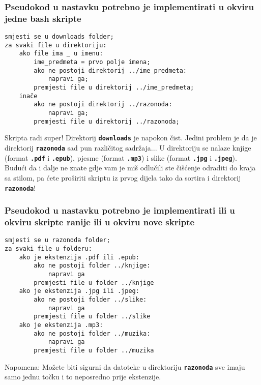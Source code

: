 \documentclass[12pt,a4paper]{article}
\newcommand{\shell}[1]{\texttt{\textbf{#1}}}
\begin{document}
    \subsubsection*{Pseudokod u nastavku potrebno je implementirati u okviru jedne
    bash skripte}
    \begin{verbatim}
smjesti se u downloads folder;
za svaki file u direktoriju:
    ako file ima _ u imenu:
        ime_predmeta = prvo polje imena;
        ako ne postoji direktorij ../ime_predmeta:
            napravi ga;
        premjesti file u direktorij ../ime_predmeta;
    inače
        ako ne postoji direktorij ../razonoda:
            napravi ga;
        premjesti file u direktorij ../razonoda;
    \end{verbatim}

    Skripta radi super! Direktorij \shell{downloads} je napokon čist. Jedini problem
    je da je direktorij \shell{razonoda} sad pun različitog sadržaja... U
    direktoriju se nalaze knjige (format \shell{.pdf} i \shell{.epub}), pjesme
    (format \shell{.mp3}) i  slike (format \shell{.jpg} i \shell{.jpeg}).
    Budući da i dalje ne znate gdje vam je miš odlučili ste čišćenje odraditi
    do kraja sa stilom, pa ćete proširiti skriptu iz prvog dijela tako da sortira
    i direktorij \shell{razonoda}!

    \subsubsection*{Pseudokod u nastavku potrebno je implementirati ili u okviru
    skripte ranije ili u okviru nove skripte}
\begin{verbatim}
smjesti se u razonoda folder;
za svaki file u folderu:
    ako je ekstenzija .pdf ili .epub:
        ako ne postoji folder ../knjige:
            napravi ga
        premjesti file u folder ../knjige
    ako je ekstenzija .jpg ili .jpeg:
        ako ne postoji folder ../slike:
            napravi ga
        premjesti file u folder ../slike
    ako je ekstenzija .mp3:
        ako ne postoji folder ../muzika:
            napravi ga
        premjesti file u folder ../muzika
\end{verbatim}

    Napomena: Možete biti sigurni da datoteke u direktoriju \shell{razonoda} sve imaju samo
    jednu točku i to neposredno prije ekstenzije.
\end{document}
